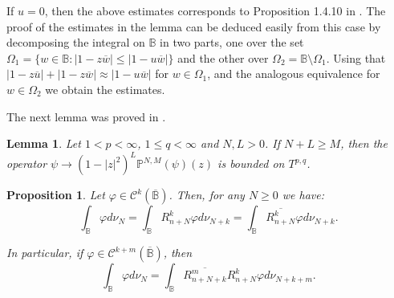 \documentclass[12pt,twoside,leqno,final]{amsart}
\theoremstyle{plain}
\newtheorem{lem}[thm]{Lemma}
\newtheorem{prop}[thm]{Proposition}
\begin{document}
 If $u=0$, then the above estimates corresponds to Proposition 1.4.10 in \cite{rudin}. 
 The proof of the  estimates in the lemma can be deduced easily from this case by 
 decomposing the integral on ${{\mathbb B}}$ in two parts, one over the set $\Omega_1=\{w\in{{\mathbb B}}: |1-z\overline w|\le |1-u\overline w|\}$ and the other over $\Omega_2={{\mathbb B}}\setminus \Omega_1$. 
  Using that $|1-z\overline u|+|1-z\overline w|\approx |1-u\overline w|$  for $w\in\Omega_1$, and the analogous equivalence for $w\in \Omega_2$ we obtain the estimates.
 
The next lemma was proved in \cite[Proposition 2.8]{Or-Fa1}.
\begin{lem} \label{lem:PPF}
Let $1< p<\infty$, $1\le q<\infty$ and $N,L>0$. If $N+L\ge M$, then the operator
$
\psi\to (1-|z|^2)^{L}{\mathbb{P}}^{N,M}(\psi)(z)
$ 
is bounded on $T^{p,q}$.
\end{lem}
 
\begin{prop} \label{prop:intpartsphi}
Let $\varphi\in \mathcal{C}^k(\overline{{\mathbb B}})$. Then, for any $N\ge 0$ we have:
$$
\int_{{\mathbb B}} \varphi d\nu_N=\int_{{\mathbb B}} R^k_{n+N}\varphi d\nu_{N+k} =\int_{{\mathbb B}} \overline{R^k_{n+N}}\varphi d\nu_{N+k}.
$$

In particular, if $\varphi\in \mathcal{C}^{k+m}(\overline{{\mathbb B}})$, then 
\begin{equation}\label{eqn:intpartsphi}
\int_{{\mathbb B}} \varphi d\nu_N=\int_{{\mathbb B}} \overline{R^m_{n+N+k}}R^k_{n+N}\varphi d\nu_{N+k+m}. 
\end{equation}
\end{prop}
\end{document}
